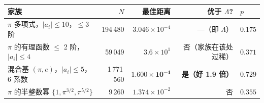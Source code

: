 \documentclass[12pt,a4paper]{article}
\begin{document}
\begin{enumerate}
  \begin{center}
  \footnotesize
  \scriptsize
  \begin{tabular}{@{}lrrrl@{}}
  \toprule
  \textbf{家族} & $N$ & \textbf{最佳距离} & \textbf{优于 $\Lambda$?} & $p$ \\
  \midrule
  $\pi$ 多项式，$\lvert a_i\rvert\le10$，$\le 3$ 阶 & 194\,480 & $3.046\times10^{-4}$ & —（即 $\Lambda$） & $0.175$ \\
  $\pi$ 的有理函数 $\le$ 2 阶，$\lvert a_i\rvert\le4$ & 59\,049 & $3.6\times10^{1}$ & 否（家族在该处过稀） & $0.371$ \\
  混合基 $(\pi,e)$，$\lvert a_i\rvert\le5$，6 系数 & 1\,771\,560 & $\mathbf{1.600\times10^{-4}}$ & \textbf{是（好 1.9 倍）} & $\mathbf{0.729}$ \\
  $\pi$ 的半整数幂 $\{1,\pi^{3/2},\pi^{5/2}\}$ & 9\,260 & $1.374\times10^{-2}$ & 否 & $0.355$ \\
  \bottomrule
  \end{tabular}
  \end{center}


\end{enumerate}
\end{document}

